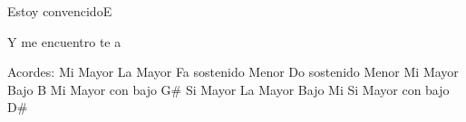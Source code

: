 \documentclass[12pt, spanish]{book}
\begin{document}
\begin{song}{Estoy convencido}{E}
\begin{SBChorus}
            Y  me encuentro te a 
        \end{SBChorus}

        \ifChordBk
        \begin{SBOpGroup}
            Acordes:\break
            \upchord{\E}\qquad Mi Mayor \hfill
            \upchord{\A}\qquad La Mayor \hfill\null\break
            \upchord{\Fsm}\qquad Fa sostenido Menor \hfill
            \upchord{\Csm}\qquad Do sostenido Menor \hfill\null\break
            \upchord{\EB}\qquad\qquad Mi Mayor Bajo B \hfill
            \upchord{\EGs}\qquad Mi Mayor con bajo G\# \hfill\null\break
            \upchord{\B}\qquad\qquad Si Mayor \hfill
            \upchord{\AEg}\qquad La Mayor Bajo Mi \hfill\null\break
            \upchord{\BDs}\qquad Si Mayor con bajo D\# \hfill\null\break
        \end{SBOpGroup}
        \fi
    \end{song}
\end{document}
